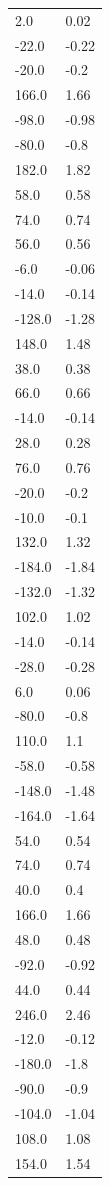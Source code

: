\begin{longtable}{ll}
2.0 & 0.02 \\
-22.0 & -0.22 \\
-20.0 & -0.2 \\
166.0 & 1.66 \\
-98.0 & -0.98 \\
-80.0 & -0.8 \\
182.0 & 1.82 \\
58.0 & 0.58 \\
74.0 & 0.74 \\
56.0 & 0.56 \\
-6.0 & -0.06 \\
-14.0 & -0.14 \\
-128.0 & -1.28 \\
148.0 & 1.48 \\
38.0 & 0.38 \\
66.0 & 0.66 \\
-14.0 & -0.14 \\
28.0 & 0.28 \\
76.0 & 0.76 \\
-20.0 & -0.2 \\
-10.0 & -0.1 \\
132.0 & 1.32 \\
-184.0 & -1.84 \\
-132.0 & -1.32 \\
102.0 & 1.02 \\
-14.0 & -0.14 \\
-28.0 & -0.28 \\
6.0 & 0.06 \\
-80.0 & -0.8 \\
110.0 & 1.1 \\
-58.0 & -0.58 \\
-148.0 & -1.48 \\
-164.0 & -1.64 \\
54.0 & 0.54 \\
74.0 & 0.74 \\
40.0 & 0.4 \\
166.0 & 1.66 \\
48.0 & 0.48 \\
-92.0 & -0.92 \\
44.0 & 0.44 \\
246.0 & 2.46 \\
-12.0 & -0.12 \\
-180.0 & -1.8 \\
-90.0 & -0.9 \\
-104.0 & -1.04 \\
108.0 & 1.08 \\
154.0 & 1.54 \\

\end{longtable}
